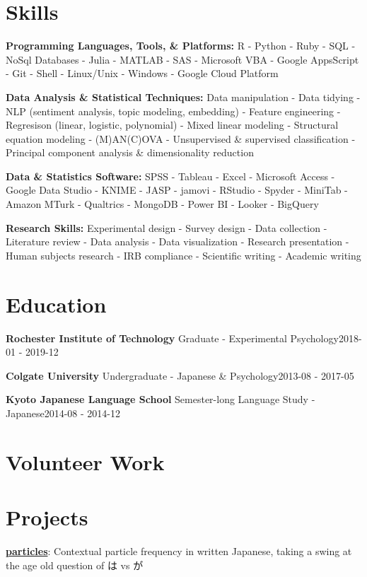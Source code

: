 \documentclass[a4paper,9pt]{extarticle}
\begin{document}
\section*{Skills}
\noindent\textbf{Programming Languages, Tools, \& Platforms:} R - Python - Ruby - SQL - NoSql Databases - Julia - MATLAB - SAS - Microsoft VBA - Google AppsScript - Git - Shell - Linux/Unix - Windows - Google Cloud Platform

\noindent\textbf{Data Analysis \& Statistical Techniques:} Data manipulation - Data tidying - NLP (sentiment analysis, topic modeling, embedding) - Feature engineering - Regresison (linear, logistic, polynomial) - Mixed linear modeling - Structural equation modeling - (M)AN(C)OVA - Unsupervised \& supervised classification - Principal component analysis \& dimensionality reduction

\noindent\textbf{Data \& Statistics Software:} SPSS - Tableau - Excel - Microsoft Access - Google Data Studio - KNIME - JASP - jamovi - RStudio - Spyder - MiniTab - Amazon MTurk - Qualtrics - MongoDB - Power BI - Looker - BigQuery

\noindent\textbf{Research Skills:} Experimental design - Survey design - Data collection - Literature review - Data analysis - Data visualization - Research presentation - Human subjects research - IRB compliance - Scientific writing - Academic writing

\section*{Education}
\noindent\textbf{Rochester Institute of Technology}
Graduate - Experimental Psychology\hfill2018-01 - 2019-12

\noindent\textbf{Colgate University}
Undergraduate - Japanese \& Psychology\hfill2013-08 - 2017-05

\noindent\textbf{Kyoto Japanese Language School}
Semester-long Language Study - Japanese\hfill2014-08 - 2014-12

\section*{Volunteer Work}

\section*{Projects}
\noindent\textbf{\href{https://github.com/ryancahildebrandt/particles}{particles}}: Contextual particle frequency in written Japanese, taking a swing at the age old question of は vs が
\end{document}
